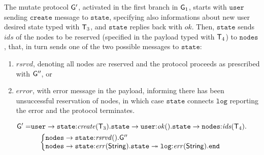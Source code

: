 The mutate protocol ${\sf G}'$, activated in the first branch in ${\sf G}_1$, starts with $\mathtt{user}$ sending 
$\mathtt{create}$ message to $\mathtt{state}$, specifying also informations about new user desired state typed with ${\mathsf T}_3$, 
and $\mathtt{state}$ replies back with $\mathit{ok}$. 
Then, $\mathtt{state}$ sends $\mathit{ids}$ of the nodes to be reserved (specified in the payload typed with ${\mathsf T}_4$) to $\mathtt{nodes}$, that, in turn sends one of the two possible messages to $\mathtt{state}$: 

\begin{enumerate}[start=1,label={(\bfseries \roman*)}]
	\item $\mathit{rsrvd}$, denoting all nodes are reserved and the protocol proceeds as prescribed with ${\sf G}''$, or
	\item $\mathit{error}$, with error message in the payload, informing there has been unsuccessful reservation of nodes, in which case $\mathtt{state}$ connects $\mathtt{log}$ reporting the error and the protocol terminates.
\end{enumerate}

\noindent
\begin{align*}
\G' = & 
\mathtt{user} \to \mathtt{state}{:}\mathit{create}(\T_3).
\mathtt{state} \to \mathtt{user}{:}\mathit{ok}().%
\mathtt{state}\to\mathtt{nodes}{:}\mathit{ids}(\T_4). \\
& \hspace{4mm}
\left\{
\begin{array}{@{}l@{}}
\mathtt{nodes}\to \mathtt{state}{:}\mathit{rsrvd}().\G''\\
\mathtt{nodes}\to \mathtt{state}{:}\mathit{err}(\mathsf{String}).\mathtt{state}\twoheadrightarrow\mathtt{log}{:}\mathit{err}(\mathsf{String}).\tend
\end{array} \right.
\end{align*}


